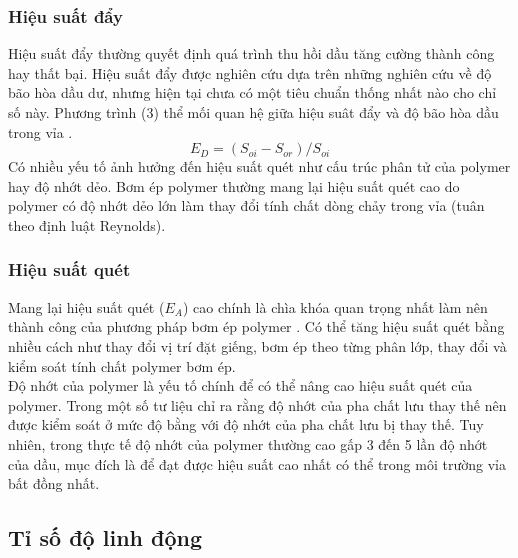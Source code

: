 \documentclass[12pt,a4paper]{article}
\begin{document}
	\subsubsection{Hiệu suất đẩy}
	Hiệu suất đẩy thường quyết định quá trình thu hồi dầu tăng cường thành công hay thất bại. Hiệu suất đẩy được nghiên cứu dựa trên những nghiên cứu về độ bão hòa dầu dư, nhưng hiện tại chưa có một tiêu chuẩn thống nhất nào cho chỉ số này. Phương trình (3) thể mối quan hệ giữa hiệu suât đẩy và độ bão hòa dầu trong vỉa \cite{green1998enhanced}.
		\begin{equation}
			E_D=(S_{oi}-S_{or})/S_{oi}
		\end{equation}
	Có nhiều yếu tố ảnh hưởng đến hiệu suất quét như cấu trúc phân tử của polymer hay độ nhớt dẻo. Bơm ép polymer thường mang lại hiệu suất quét cao do polymer có độ nhớt dẻo lớn làm thay đổi tính chất dòng chảy trong vỉa (tuân theo định luật Reynolds). 

	\subsubsection{Hiệu suất quét}
	Mang lại hiệu suất quét ($E_A$) cao chính là chìa khóa quan trọng nhất làm nên thành công của phương pháp bơm ép polymer \cite{sheng2010modern}. Có thể tăng hiệu suất quét bằng nhiều cách như thay đổi vị trí đặt giếng, bơm ép theo từng phân lớp, thay đổi và kiểm soát tính chất polymer bơm ép.\\
	Độ nhớt của polymer là yếu tố chính để có thể nâng cao hiệu suất quét của polymer. Trong một số tư liệu chỉ ra rằng độ nhớt của pha chất lưu thay thế nên được kiểm soát ở mức độ bằng với độ nhớt của pha chất lưu bị thay thế. Tuy nhiên, trong thực tế độ nhớt của polymer thường cao gấp 3 đến 5 lần độ nhớt của dầu, mục đích là để đạt được hiệu suất cao nhất có thể trong môi trường vỉa bất đồng nhất.\\

	\subsection{Tỉ số độ linh động}
\end{document}
